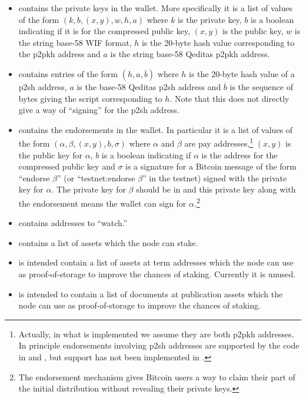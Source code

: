 \begin{itemize}
\item {} contains the private keys in the wallet.
More specifically it is a list of values of the form $(k,b,(x,y),w,h,a)$
where $k$ is the private key, $b$ is a boolean indicating if it is for the compressed public key,
$(x,y)$ is the public key, $w$ is the string base-58 WIF format, $h$ is the 20-byte hash value
corresponding to the p2pkh address and $a$ is the string base-58 Qeditas p2pkh address.
\item {} contains entries of the form $(h,a,\overline{b})$
where $h$ is the 20-byte hash value of a p2sh address, $a$ is the base-58 Qeditas p2sh address
and $\overline{b}$ is the sequence of bytes giving the script corresponding to $h$.
Note that this does not directly give a way of ``signing'' for the p2sh address.
\item {} contains the endorsements in the wallet.
In particular it is a list of values of the form $(\alpha,\beta,(x,y),b,\sigma)$
where $\alpha$ and $\beta$ are pay addresses,\footnote{Actually, in what is implemented we assume they are both p2pkh addresses. In principle endorsements involving p2sh addresses are supported by the code in {} and {}, but support has not been implemented in {}.}
$(x,y)$ is the public key for $\alpha$,
$b$ is a boolean indicating if $\alpha$ is the address for the compressed public key
and $\sigma$ is a signature for a
Bitcoin message of the form ``endorse $\beta$''
(or ``testnet:endorse $\beta$'' in the testnet)
signed with the private key for $\alpha$.
The private key for $\beta$ should be in {}
and this private key along with the endorsement means the wallet can sign for $\alpha$.\footnote{The endorsement mechanism gives Bitcoin users a way to claim their part of the initial distribution without revealing their private keys.}
\item {}
contains addresses to ``watch.'' 
\item {}
contains a list of assets which the node can stake.
\item {}
is intended contain a list of assets at term addresses which the node can use as proof-of-storage to improve the chances of staking.
Currently it is unused.
\item {}
is intended to contain a list of documents at publication assets which the node can use as proof-of-storage to improve the chances of staking.

\end{itemize}
